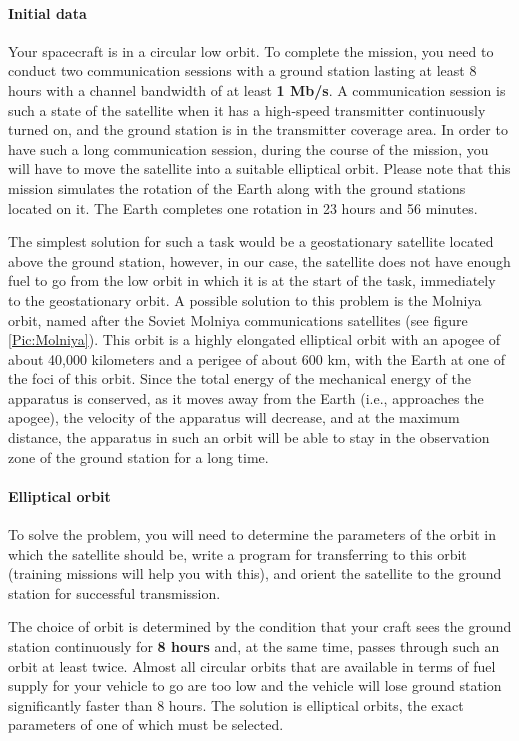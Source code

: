 \documentclass[12pt,a4paper]{article}
\begin{document}
\paragraph{Initial data}

Your spacecraft is in a circular low orbit. To complete the mission, you need to conduct two communication sessions with a ground station lasting at least 8 hours with a channel bandwidth of at least \textbf{1 Mb/s}. A communication session is such a state of the satellite when it has a high-speed transmitter continuously turned on, and the ground station is in the transmitter coverage area. In order to have such a long communication session, during the course of the mission, you will have to move the satellite into a suitable elliptical orbit. Please note that this mission simulates the rotation of the Earth along with the ground stations located on it. The Earth completes one rotation in 23 hours and 56 minutes.

The simplest solution for such a task would be a geostationary satellite located above the ground station, however, in our case, the satellite does not have enough fuel to go from the low orbit in which it is at the start of the task, immediately to the geostationary orbit. A possible solution to this problem is the Molniya orbit, named after the Soviet Molniya communications satellites (see figure \ref{Pic:Molniya}). This orbit is a highly elongated elliptical orbit with an apogee of about 40,000 kilometers and a perigee of about 600 km, with the Earth at one of the foci of this orbit. Since the total energy of the mechanical energy of the apparatus is conserved, as it moves away from the Earth (i.e., approaches the apogee), the velocity of the apparatus will decrease, and at the maximum distance, the apparatus in such an orbit will be able to stay in the observation zone of the ground station for a long time.

\paragraph{Elliptical orbit}

To solve the problem, you will need to determine the parameters of the orbit in which the satellite should be, write a program for transferring to this orbit (training missions will help you with this), and orient the satellite to the ground station for successful transmission.

The choice of orbit is determined by the condition that your craft sees the ground station continuously for \textbf{8 hours} and, at the same time, passes through such an orbit at least twice. Almost all circular orbits that are available in terms of fuel supply for your vehicle to go are too low and the vehicle will lose ground station significantly faster than 8 hours. The solution is elliptical orbits, the exact parameters of one of which must be selected.
\end{document}
